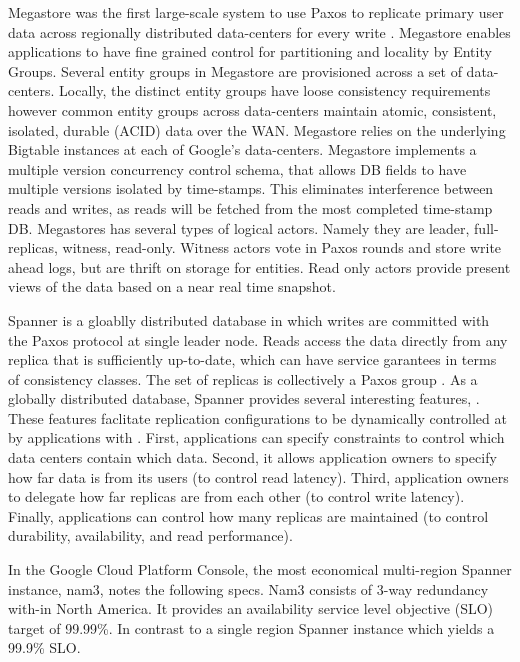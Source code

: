 \documentclass[conference]{IEEEtran}
\begin{document}
Megastore was the first large-scale system to use Paxos to replicate primary user data across regionally distributed data-centers for every write \cite{megastore}. Megastore enables applications to have fine grained control for partitioning and locality by Entity Groups. Several entity groups in Megastore are provisioned across a set of data-centers. Locally, the distinct entity groups have loose consistency requirements however common entity groups across data-centers maintain atomic, consistent, isolated, durable (ACID) data over the WAN. Megastore relies on the underlying Bigtable \cite{bigtable} instances at each of Google's data-centers. Megastore implements a multiple version concurrency control schema, that allows DB fields to have multiple versions isolated by time-stamps. This eliminates interference between reads and writes, as reads will be fetched from the most completed time-stamp DB. Megastores has several types of logical actors. Namely they are leader, full-replicas, witness, read-only. Witness actors vote in Paxos rounds and store write ahead logs, but are thrift on storage for entities. Read only actors provide present views of the data based on a near real time snapshot.

Spanner is a gloablly distributed database in which writes are committed with the Paxos protocol at single leader node. Reads access the data directly from any replica  that  is  sufficiently  up-to-date, which can have service garantees in terms of consistency classes.  The  set  of replicas is collectively a Paxos group \cite{Spanner}. As a globally distributed database, Spanner provides several interesting features, \cite{Spanner}. These features faclitate replication configurations to be dynamically controlled at by applications with . First, applications can specify constraints to control which data centers contain which data. Second, it allows application owners to specify how far data is from its users (to control read latency). Third, application owners to delegate how far replicas  are  from  each  other  (to  control  write  latency). Finally, applications can control  how  many  replicas  are maintained (to control durability, availability, and read performance). 

In the Google Cloud Platform Console, the most economical multi-region Spanner instance, nam3, notes the following specs. Nam3 consists of 3-way redundancy with-in North America. It provides an availability service level objective (SLO) target of 99.99\%. In contrast to a single region Spanner instance which yields a 99.9\% SLO. 
\end{document}
